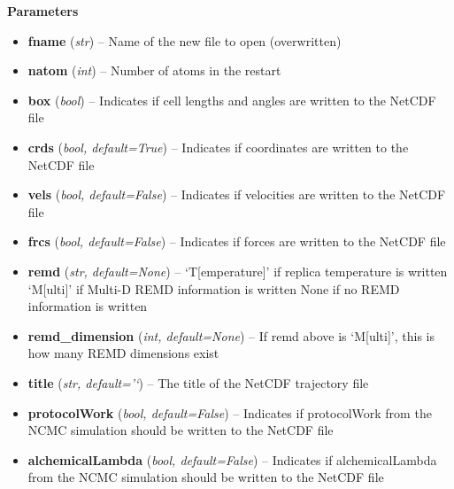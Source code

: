 \begin{description}
\begin{description}
\begin{description}
\item
    \textbf{Parameters}
\begin{itemize}
\item
  \textbf{fname} (\emph{str}) -- Name of the new file to open
  (overwritten)
\item
  \textbf{natom} (\emph{int}) -- Number of atoms in the restart
\item
  \textbf{box} (\emph{bool}) -- Indicates if cell lengths and angles are
  written to the NetCDF file
\item
  \textbf{crds} (\emph{bool, default=True}) -- Indicates if coordinates
  are written to the NetCDF file
\item
  \textbf{vels} (\emph{bool, default=False}) -- Indicates if velocities
  are written to the NetCDF file
\item
  \textbf{frcs} (\emph{bool, default=False}) -- Indicates if forces are
  written to the NetCDF file
\item
  \textbf{remd} (\emph{str, default=None}) -- `T{[}emperature{]}' if
  replica temperature is written `M{[}ulti{]}' if Multi-D REMD
  information is written None if no REMD information is written
\item
  \textbf{remd\_dimension} (\emph{int, default=None}) -- If remd above
  is `M{[}ulti{]}', this is how many REMD dimensions exist
\item
  \textbf{title} (\emph{str, default='`}) -- The title of the NetCDF
  trajectory file
\item
  \textbf{protocolWork} (\emph{bool, default=False}) -- Indicates if
  protocolWork from the NCMC simulation should be written to the NetCDF
  file
\item
  \textbf{alchemicalLambda} (\emph{bool, default=False}) -- Indicates if
  alchemicalLambda from the NCMC simulation should be written to the
  NetCDF file
\end{itemize}
\end{description}
\end{description}
\end{description}
